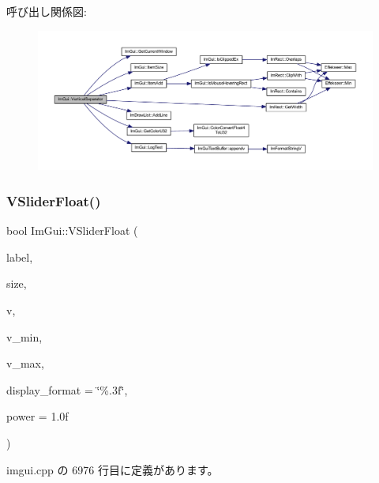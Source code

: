 呼び出し関係図\+:\nopagebreak
\begin{figure}[H]
\begin{center}
\leavevmode
\includegraphics[width=350pt]{namespace_im_gui_ae60f7b8ece8808c477796e6594c8d796_cgraph}
\end{center}
\end{figure}
\mbox{\label{namespace_im_gui_ae629791ee70ba60199597cd1866b3735}} 
\subsubsection{\texorpdfstring{V\+Slider\+Float()}{VSliderFloat()}}
{\footnotesize\ttfamily bool Im\+Gui\+::\+V\+Slider\+Float (\begin{DoxyParamCaption}\item[{const char $\ast$}]{label,  }\item[{const \mbox{\hyperlink{struct_im_vec2}{Im\+Vec2}} \&}]{size,  }\item[{float $\ast$}]{v,  }\item[{float}]{v\+\_\+min,  }\item[{float}]{v\+\_\+max,  }\item[{const char $\ast$}]{display\+\_\+format = {\ttfamily \char`\"{}\%.3f\char`\"{}},  }\item[{float}]{power = {\ttfamily 1.0f} }\end{DoxyParamCaption})}



 imgui.\+cpp の 6976 行目に定義があります。

